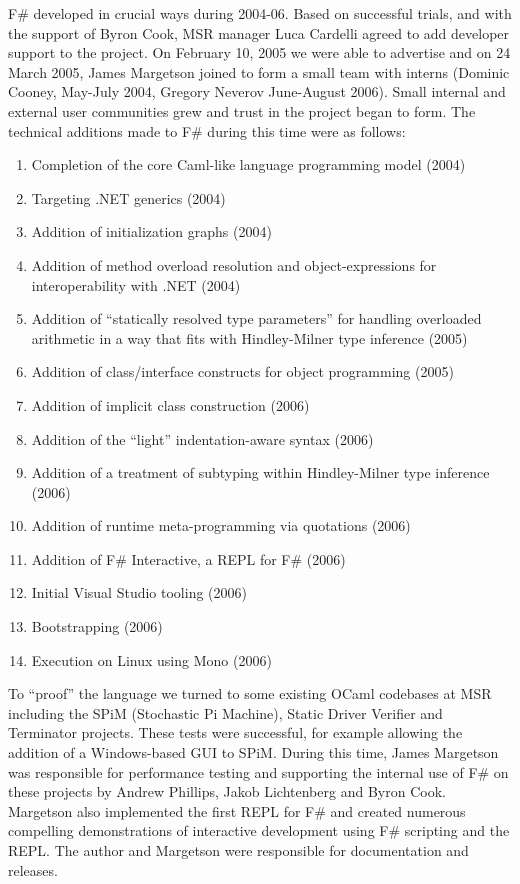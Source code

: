 \documentclass[acmsmall]{acmart}\settopmatter{}
\begin{document}
F\# developed in crucial ways during 2004-06.  Based on successful trials, and with the support of Byron Cook, MSR manager Luca Cardelli agreed to add developer support to the project. On February 10, 2005 we were able to advertise and on 24 March 2005, James Margetson joined to form a small team with interns (Dominic Cooney, May-July 2004, Gregory Neverov June-August 2006). Small internal and external user communities grew and trust in the project began to form. The technical additions made to F\# during this time were as follows:

\begin{enumerate}
\item Completion of the core Caml-like language programming model (2004)
\item Targeting .NET generics (2004)
\item Addition of initialization graphs (2004)
\item Addition of method overload resolution and object-expressions for interoperability with .NET (2004)
\item Addition of “statically resolved type parameters” for handling overloaded arithmetic in a way that fits with Hindley-Milner type inference (2005)
\item Addition of class/interface constructs for object programming (2005)
\item Addition of implicit class construction (2006)
\item Addition of the “light” indentation-aware syntax (2006)
\item Addition of a treatment of subtyping within Hindley-Milner type inference (2006)
\item Addition of runtime meta-programming via quotations (2006)
\item Addition of F\# Interactive, a REPL for F\# (2006)
\item Initial Visual Studio tooling (2006)
\item Bootstrapping (2006)
\item Execution on Linux using Mono (2006)
\end{enumerate}

To “proof” the language we turned to some existing OCaml codebases at MSR including the SPiM (Stochastic Pi Machine), Static Driver Verifier and Terminator projects.  These tests were successful, for example allowing the addition of a Windows-based GUI to SPiM.   During this time, James Margetson was responsible for performance testing and supporting the internal use of F\# on these projects by Andrew Phillips, Jakob Lichtenberg and Byron Cook. Margetson also implemented the first REPL for F\# and created numerous compelling demonstrations of interactive development using F\# scripting and the REPL. The author and Margetson were responsible for documentation and releases.
\end{document}
